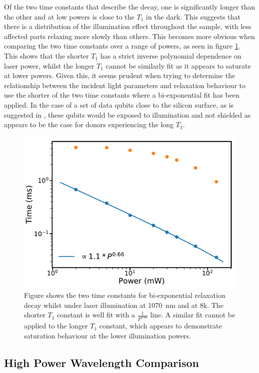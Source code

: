 Of the two time constants that describe the decay, one is significantly longer than the other and at low powers is close to the $T_1$ in the dark.
This suggests that there is a distribution of the illumination effect throughout the sample, with less affected parts relaxing more slowly than others. 
This becomes more obvious when comparing the two time constants over a range of powers, as seen in figure \ref{fig:T1avsT1b}.
This shows that the shorter $T_1$ has a strict inverse polynomial dependence on laser power, whilst the longer $T_1$ cannot be similarly fit as it appears to saturate at lower powers.
Given this, it seems prudent when trying to determine the relationship between the incident light parameters and relaxation behaviour to use the shorter of the two time constants where a bi-exponential fit has been applied.
In the case of a set of data qubits close to the silicon surface, as is suggested in \cite{OGorman2014}, these qubits would be exposed to illumination and not shielded as appears to be the case for donors experiencing the long $T_1$.



\begin{figure}
\centering
\includegraphics[width = 0.8\columnwidth]{Figures/hpT1avsT1b.pdf} 
\caption[Bi-exponential relaxation decay constants]{Figure shows the two time constants for bi-exponential relaxation decay whilst under laser illumination at 1070~nm and at 8k. The shorter $T_1$ constant is well fit with a $\frac{1}{P^{0.66}}$ line. A similar fit cannot be applied to the longer $T_1$ constant, which appears to demonstrate saturation behaviour at the lower illumination powers.}
\label{fig:T1avsT1b}
\end{figure}

\subsection{High Power Wavelength Comparison}
